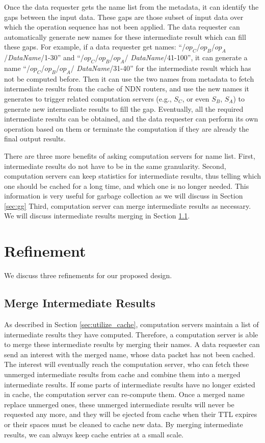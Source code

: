 \documentclass[journal]{IEEEtran}
\begin{document}
Once the data requester gets the name list from the metadata, it can identify
the gaps between the input data.  These gaps are those subset of input data over
which the operation sequence has not been applied.  The data requester can
automatically generate new names for these intermediate result which can fill
these gaps. For example, if a data requester get names:
``/$op_C$/$op_B$/$op_A$/{\it DataName}/1-30'' and ``/$op_C$/$op_B$/$op_A$/{\it
  DataName}/41-100'', it can generate a name ``/$op_C$/$op_B$/$op_A$/{\it
  DataName}/31-40'' for the intermediate result which has not be computed
before.  Then it can use the two names from metadata to fetch intermediate
results from the cache of NDN routers, and use the new names it generates to
trigger related computation servers (e.g., $S_C$, or even $S_B$, $S_A$) to
generate new intermediate results to fill the gap.  Eventually, all the required
intermediate results can be obtained, and the data requester can perform its own
operation based on them or terminate the computation if they are already the
final output results.

There are three more benefits of asking computation servers for name list.  First,
intermediate results do not have to be in the same granularity.  Second,
computation servers can keep statistics for intermediate results, thus telling
which one should be cached for a long time, and which one is no longer needed. This
information is very useful for garbage collection as we will discuss in Section
\ref{sec:gg} Third, computation server can merge intermediate results
as necessary. We will discuss intermediate results merging in Section \ref{sec:merge}.

\section{Refinement}
We discuss three refinements for our proposed design.
\subsection{Merge Intermediate Results}\label{sec:merge}
As described in Section \ref{sec:utilize_cache}, computation servers maintain a list
of intermediate results they have computed.  Therefore, a computation server is
able to merge these intermediate results by merging their names.  A data
requester can send an {\sc interest} with the merged name, whose {\sc data}
packet has not been cached.  The {\sc interest} will eventually reach the
computation server, who can fetch these unmerged intermediate results from cache
and combine them into a merged intermediate results.  If some parts of
intermediate results have no longer existed in cache, the computation server can
re-compute them.  Once a merged name replace unmerged ones, these unmerged
intermediate results will never be requested any more, and they will be ejected
from cache when their TTL expires or their spaces must be cleaned to cache new
data.  By merging intermediate results, we can always keep cache entries at a
small scale.
\end{document}
